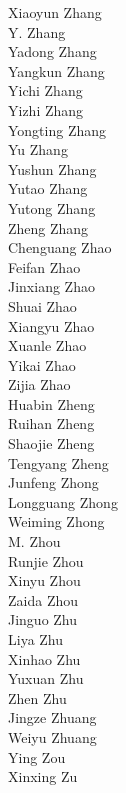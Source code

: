 Xiaoyun Zhang\\
Y. Zhang\\
Yadong Zhang\\
Yangkun Zhang\\
Yichi Zhang\\
Yizhi Zhang\\
Yongting Zhang\\
Yu Zhang\\
Yushun Zhang\\
Yutao Zhang\\
Yutong Zhang\\
Zheng Zhang\\
Chenguang Zhao\\
Feifan Zhao\\
Jinxiang Zhao\\
Shuai Zhao\\
Xiangyu Zhao\\
Xuanle Zhao\\
Yikai Zhao\\
Zijia Zhao\\
Huabin Zheng\\
Ruihan Zheng\\
Shaojie Zheng\\
Tengyang Zheng\\
Junfeng Zhong\\
Longguang Zhong\\
Weiming Zhong\\
M. Zhou\\
Runjie Zhou\\
Xinyu Zhou\\
Zaida Zhou\\
Jinguo Zhu\\
Liya Zhu\\
Xinhao Zhu\\
Yuxuan Zhu\\
Zhen Zhu\\
Jingze Zhuang\\
Weiyu Zhuang\\
Ying Zou\\
Xinxing Zu\\